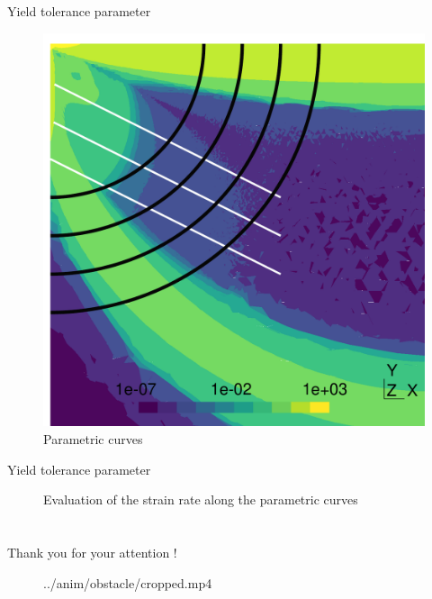 \documentclass{beamer}  %
\begin{document}
\begin{frame}{Yield tolerance parameter}
\begin{figure}
\begin{overprint}
{                \includegraphics[height=0.65\textheight]{../figures/correction_2.pdf}
                \caption*{Parametric curves}
            }
        \end{overprint}
    \end{figure}
\end{frame}

\begin{frame}{Yield tolerance parameter}
    \begin{figure}
        \begin{overprint}
        \end{overprint}
        \caption*{Evaluation of the strain rate along the parametric curves}
    \end{figure}
\end{frame}

\section*{}
\begin{frame}
    \begin{center}
        \LARGE
        Thank you for your attention !
        \normalsize
    \end{center}
    \begin{figure}
        \centering
        \movie[width=0.71\textheight, height=0.6\textheight, autostart, loop]{} {../anim/obstacle/cropped.mp4}
    \end{figure}
\end{frame}
\end{document}

